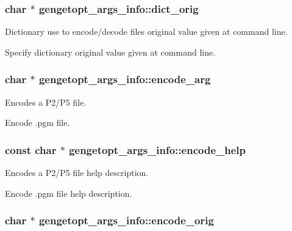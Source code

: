 \subsubsection[{dict\+\_\+orig}]{\setlength{\rightskip}{0pt plus 5cm}char $\ast$ gengetopt\+\_\+args\+\_\+info\+::dict\+\_\+orig}\label{structgengetopt__args__info_acca4a4510495e721e10c44306b85381a}


Dictionary use to encode/decode files original value given at command line. 

Specify dictionary original value given at command line. \hypertarget{structgengetopt__args__info_a239d3bebc999ba0c82a711b355e8a8f9}{}
\subsubsection[{encode\+\_\+arg}]{\setlength{\rightskip}{0pt plus 5cm}char $\ast$ gengetopt\+\_\+args\+\_\+info\+::encode\+\_\+arg}\label{structgengetopt__args__info_a239d3bebc999ba0c82a711b355e8a8f9}


Encodes a P2/\+P5 file. 

Encode .pgm file. \hypertarget{structgengetopt__args__info_a9a9249c35f6b920c9adcf5b604e0e098}{}
\subsubsection[{encode\+\_\+help}]{\setlength{\rightskip}{0pt plus 5cm}const char $\ast$ gengetopt\+\_\+args\+\_\+info\+::encode\+\_\+help}\label{structgengetopt__args__info_a9a9249c35f6b920c9adcf5b604e0e098}


Encodes a P2/\+P5 file help description. 

Encode .pgm file help description. \hypertarget{structgengetopt__args__info_acb893689b182218054b2bd202c13042f}{}
\subsubsection[{encode\+\_\+orig}]{\setlength{\rightskip}{0pt plus 5cm}char $\ast$ gengetopt\+\_\+args\+\_\+info\+::encode\+\_\+orig}\label{structgengetopt__args__info_acb893689b182218054b2bd202c13042f}


